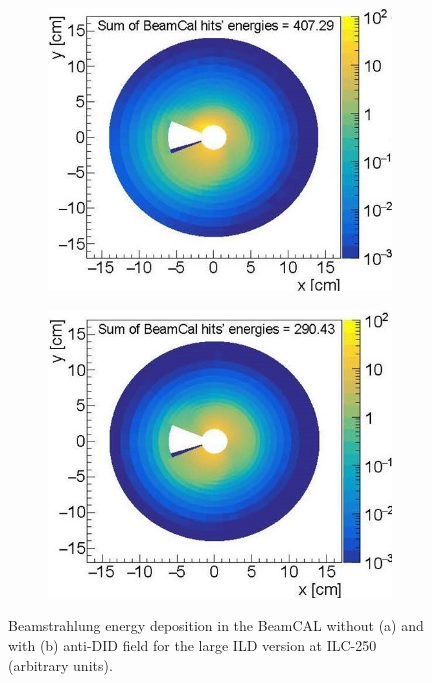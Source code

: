 \begin{figure}[t!]
\begin{subfigure}{0.48\textwidth}
\includegraphics[width=1.0\hsize]{Integration/fig/BG_beamcal_a.jpg}
\caption{}
\end{subfigure}
\begin{subfigure}{0.48\textwidth}
\includegraphics[width=1.0\hsize]{Integration/fig/BG_beamcal_b.jpg}
\caption{}
\end{subfigure}
\caption{\label{fig:integration:beamcal}Beamstrahlung energy deposition in the BeamCAL without (a) and with (b) anti-DID field for the large ILD version at ILC-250 (arbitrary units). }
\end{figure}

